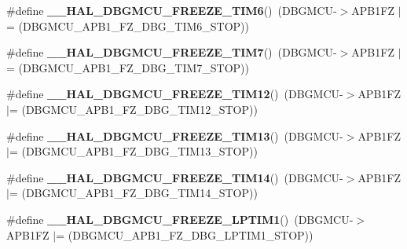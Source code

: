 \begin{DoxyCompactItemize}
\item 
\mbox{\label{group___h_a_l___exported___macros_gaccdcfde9ae6f78f0ca359776b021f87c}} 
\#define {\bfseries \+\_\+\+\_\+\+H\+A\+L\+\_\+\+D\+B\+G\+M\+C\+U\+\_\+\+F\+R\+E\+E\+Z\+E\+\_\+\+T\+I\+M6}()~(D\+B\+G\+M\+CU-\/$>$A\+P\+B1\+FZ $\vert$= (D\+B\+G\+M\+C\+U\+\_\+\+A\+P\+B1\+\_\+\+F\+Z\+\_\+\+D\+B\+G\+\_\+\+T\+I\+M6\+\_\+\+S\+T\+OP))
\item 
\mbox{\label{group___h_a_l___exported___macros_ga8541da9b4d428d41e218e9701e4307d1}} 
\#define {\bfseries \+\_\+\+\_\+\+H\+A\+L\+\_\+\+D\+B\+G\+M\+C\+U\+\_\+\+F\+R\+E\+E\+Z\+E\+\_\+\+T\+I\+M7}()~(D\+B\+G\+M\+CU-\/$>$A\+P\+B1\+FZ $\vert$= (D\+B\+G\+M\+C\+U\+\_\+\+A\+P\+B1\+\_\+\+F\+Z\+\_\+\+D\+B\+G\+\_\+\+T\+I\+M7\+\_\+\+S\+T\+OP))
\item 
\mbox{\label{group___h_a_l___exported___macros_ga2bbe99ec741228b520e17b1bf38eb2ad}} 
\#define {\bfseries \+\_\+\+\_\+\+H\+A\+L\+\_\+\+D\+B\+G\+M\+C\+U\+\_\+\+F\+R\+E\+E\+Z\+E\+\_\+\+T\+I\+M12}()~(D\+B\+G\+M\+CU-\/$>$A\+P\+B1\+FZ $\vert$= (D\+B\+G\+M\+C\+U\+\_\+\+A\+P\+B1\+\_\+\+F\+Z\+\_\+\+D\+B\+G\+\_\+\+T\+I\+M12\+\_\+\+S\+T\+OP))
\item 
\mbox{\label{group___h_a_l___exported___macros_ga21bfaea50e429031982861b2869c6863}} 
\#define {\bfseries \+\_\+\+\_\+\+H\+A\+L\+\_\+\+D\+B\+G\+M\+C\+U\+\_\+\+F\+R\+E\+E\+Z\+E\+\_\+\+T\+I\+M13}()~(D\+B\+G\+M\+CU-\/$>$A\+P\+B1\+FZ $\vert$= (D\+B\+G\+M\+C\+U\+\_\+\+A\+P\+B1\+\_\+\+F\+Z\+\_\+\+D\+B\+G\+\_\+\+T\+I\+M13\+\_\+\+S\+T\+OP))
\item 
\mbox{\label{group___h_a_l___exported___macros_gaf4d10c15c1644eeff138829af21c219c}} 
\#define {\bfseries \+\_\+\+\_\+\+H\+A\+L\+\_\+\+D\+B\+G\+M\+C\+U\+\_\+\+F\+R\+E\+E\+Z\+E\+\_\+\+T\+I\+M14}()~(D\+B\+G\+M\+CU-\/$>$A\+P\+B1\+FZ $\vert$= (D\+B\+G\+M\+C\+U\+\_\+\+A\+P\+B1\+\_\+\+F\+Z\+\_\+\+D\+B\+G\+\_\+\+T\+I\+M14\+\_\+\+S\+T\+OP))
\item 
\mbox{\label{group___h_a_l___exported___macros_ga87edecce17579a16e9d9f99cee25f0a4}} 
\#define {\bfseries \+\_\+\+\_\+\+H\+A\+L\+\_\+\+D\+B\+G\+M\+C\+U\+\_\+\+F\+R\+E\+E\+Z\+E\+\_\+\+L\+P\+T\+I\+M1}()~(D\+B\+G\+M\+CU-\/$>$A\+P\+B1\+FZ $\vert$= (D\+B\+G\+M\+C\+U\+\_\+\+A\+P\+B1\+\_\+\+F\+Z\+\_\+\+D\+B\+G\+\_\+\+L\+P\+T\+I\+M1\+\_\+\+S\+T\+OP))

\end{DoxyCompactItemize}
